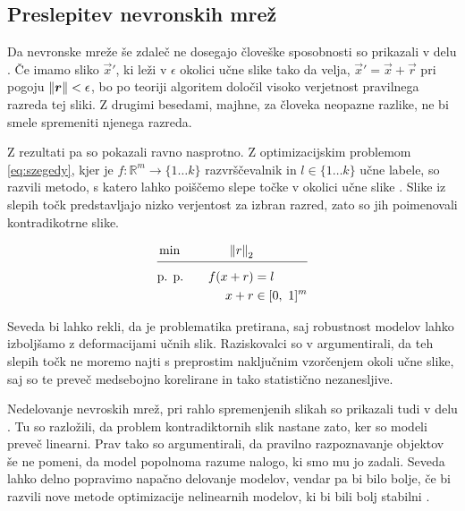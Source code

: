 \subsection{Preslepitev nevronskih mrež}
Da nevronske mreže še zdaleč ne dosegajo človeške sposobnosti so prikazali v delu \cite{szegedy2014intriguing}.  Če imamo sliko $\vec{x}'$, ki leži v $\epsilon$ okolici učne slike  tako da velja, $\vec{x}' = \vec{x} + \vec{r}$ pri pogoju $\left\lVert {\ensuremath{\boldsymbol{r}}} \right\rVert < \epsilon$, bo po teoriji algoritem določil visoko verjetnost pravilnega razreda tej sliki. Z drugimi besedami, majhne, za človeka neopazne razlike, ne bi smele spremeniti njenega razreda. 

Z rezultati pa so \cite{szegedy2014intriguing} pokazali ravno nasprotno. Z optimizacijskim problemom \eqref{eq:szegedy}, kjer je $f: \mathbb{R}^m \rightarrow \{1\ldots k\}$ razvrščevalnik in $l \in \{1\ldots k\}$ učne labele, so razvili metodo, s katero lahko poiščemo slepe točke v okolici učne slike . Slike iz slepih točk predstavljajo nizko verjentost za izbran razred, zato so jih poimenovali kontradikotrne slike. 

\begin{equation}
	\begin{aligned}
	& \min \quad& \norm{r}_2&\\[-2ex]
	\cline{2-4}
	& \text{p. p.} \quad& f(x+r) &= l  \\
	& \quad& x + r &\in [0,~1]^m
	\end{aligned}
	\label{eq:szegedy}
\end{equation}

Seveda bi lahko rekli, da je problematika pretirana, saj robustnost modelov lahko izboljšamo z deformacijami učnih slik. Raziskovalci so v \cite{szegedy2014intriguing} argumentirali, da teh slepih točk ne moremo najti s preprostim naključnim vzorčenjem okoli učne slike, saj so te preveč medsebojno korelirane in tako statistično nezanesljive. 


Nedelovanje nevroskih mrež, pri rahlo spremenjenih slikah so prikazali tudi v delu \cite{goodfellow2015explaining}. Tu so razložili, da problem kontradiktornih slik nastane zato, ker so modeli preveč linearni. Prav tako so argumentirali, da pravilno razpoznavanje objektov še ne pomeni, da model popolnoma razume nalogo, ki smo mu jo zadali. Seveda lahko delno popravimo napačno delovanje modelov, vendar pa bi bilo bolje, če bi razvili nove metode optimizacije nelinearnih modelov, ki bi bili bolj stabilni \cite{goodfellow2015explaining}.


